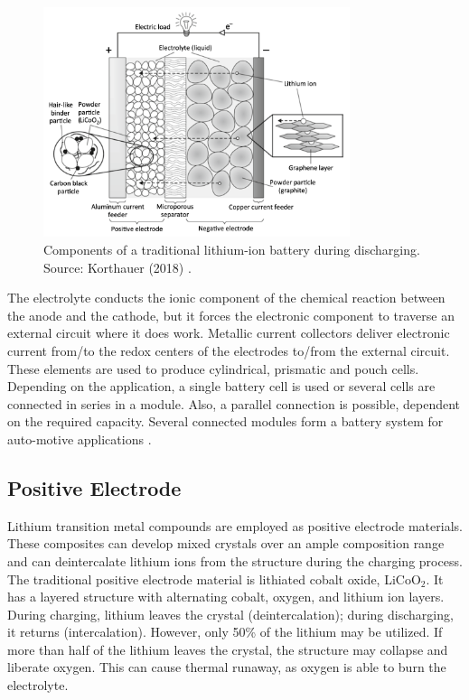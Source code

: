 \begin{figure}
    \centering
    \includegraphics[width=0.8\textwidth]{Images/Chapter1/overview.png}
    \caption[Components of a traditional lithium-ion battery during discharging]{Components of a traditional lithium-ion battery during discharging. Source: Korthauer (2018) \cite{korthauer2018lithium}.}
    \label{fig:lib-overview}
\end{figure}

The electrolyte conducts the ionic component of the chemical reaction between the anode and the cathode, but it forces the electronic component to traverse an external circuit where it does work. Metallic current collectors deliver electronic current from/to the redox centers of the electrodes to/from the external circuit. These elements are used to produce cylindrical, prismatic and pouch cells. Depending on the application, a single battery cell is used or several cells are connected in series in a module. Also, a parallel connection is possible, dependent on the required capacity. Several connected modules form a battery system for auto-motive applications \cite{korthauer2018lithium,goodenough2013li}.

\subsection{Positive Electrode}
\label{sec:positive-electrode}
Lithium transition metal compounds are employed as positive electrode materials. These composites can develop mixed crystals over an ample composition range and can deintercalate lithium ions from the structure during the charging process. The traditional positive electrode material is lithiated cobalt oxide, LiCoO$_2$. It has a layered structure with alternating cobalt, oxygen, and lithium ion layers. During charging, lithium leaves the crystal (deintercalation); during discharging, it returns (intercalation). However, only 50\% of the lithium may be utilized. If more than half of the lithium leaves the crystal, the structure may collapse and liberate oxygen. This can cause thermal runaway, as oxygen is able to burn the electrolyte. 


